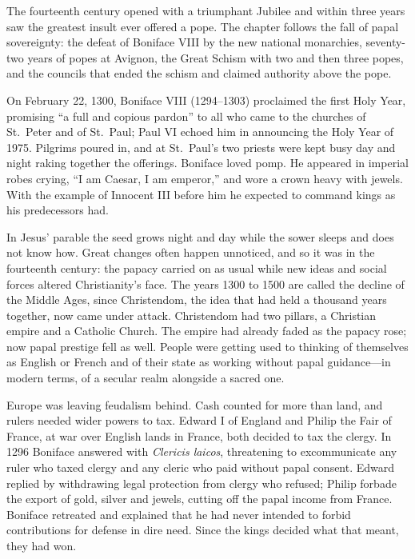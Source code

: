 
\begin{inbrief}
The fourteenth century opened with a triumphant Jubilee and within three years saw the greatest
insult ever offered a pope. The chapter follows the fall of papal sovereignty: the defeat of Boniface
VIII by the new national monarchies, seventy-two years of popes at Avignon, the Great Schism with two
and then three popes, and the councils that ended the schism and claimed authority above the pope.
\end{inbrief}

On February 22, 1300, Boniface VIII (1294--1303) proclaimed the first Holy Year, promising ``a full
and copious pardon'' to all who came to the churches of St.~Peter and of St.~Paul; Paul VI echoed him in
announcing the Holy Year of 1975. Pilgrims poured in, and at St.~Paul's two priests were kept busy day
and night raking together the offerings. Boniface loved pomp. He appeared in imperial robes crying,
``I am Caesar, I am emperor,'' and wore a crown heavy with jewels. With the example of Innocent III
before him he expected to command kings as his predecessors had.

In Jesus' parable the seed grows night and day while the sower sleeps and does not know how. Great
changes often happen unnoticed, and so it was in the fourteenth century: the papacy carried on as usual while new ideas and social forces altered Christianity's face. The years 1300 to
1500 are called the decline of the Middle Ages, since Christendom, the idea that had held a thousand years together, now came under attack. Christendom had two pillars, a Christian empire and a Catholic Church. The empire had already faded as the papacy rose; now papal prestige fell as well.
People were getting used to thinking of themselves as English or French and of their state as working
without papal guidance---in modern terms, of a secular realm alongside a sacred one.

Europe was leaving feudalism behind. Cash counted for more than land, and rulers needed wider powers
to tax. Edward I of England and Philip the Fair of France, at war over English lands in France, both
decided to tax the clergy. In 1296 Boniface answered with \emph{Clericis laicos}, threatening to
excommunicate any ruler who taxed clergy and any cleric who paid without papal consent. Edward
replied by withdrawing legal protection from clergy who refused; Philip forbade the export of gold,
silver and jewels, cutting off the papal income from France. Boniface retreated and explained that he had never intended to forbid contributions for defense in dire need. Since the kings decided what that
meant, they had won.

